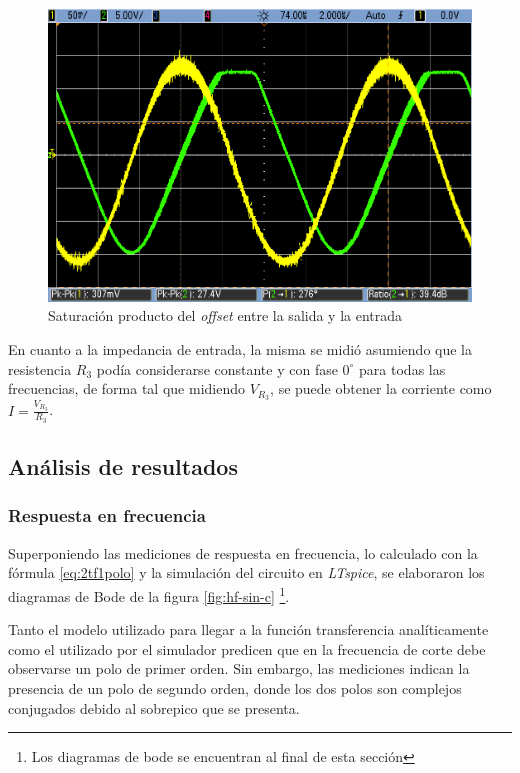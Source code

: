 \documentclass[../../main.tex]{subfiles}
\begin{document}
\begin{figure} [H]
	\centering
	\includegraphics[scale=0.5]{fotos/tc_tp2_ej2_saturacion.png}
	\caption{Saturaci\'on producto del \textit{offset} entre la salida y la entrada}
\end{figure}

En cuanto a la impedancia de entrada, la misma se midi\'o asumiendo que la resistencia $R_3$ pod\'ia considerarse constante y con fase $0^\circ$ para todas las frecuencias, de forma tal que midiendo $V_{R_3}$, se puede obtener la corriente como $I = \frac{V_{R_3}}{R_3}$.


\subsection{An\'alisis de resultados}

\subsubsection{Respuesta en frecuencia}

Superponiendo las mediciones de respuesta en frecuencia, lo calculado con la f\'ormula \ref{eq:2tf1polo} y la simulaci\'on del circuito en \textit{LTspice}, se elaboraron los diagramas de Bode de la figura \ref{fig:hf-sin-c} \footnote{Los diagramas de bode se encuentran al final de esta secci\'on}.

Tanto el modelo utilizado para llegar a la funci\'on transferencia anal\'iticamente como el utilizado por el simulador predicen que en la frecuencia de corte debe observarse un polo de primer orden. Sin embargo, las mediciones indican la presencia de un polo de segundo orden, donde los dos polos son complejos conjugados debido al sobrepico que se presenta. \par
\end{document}

